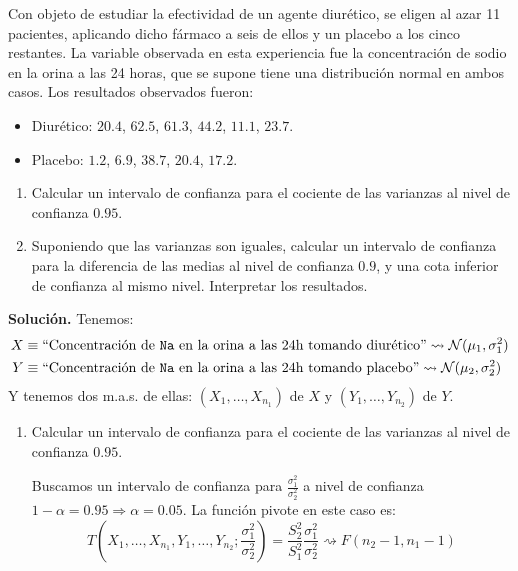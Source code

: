 \begin{ejercicio}
    Con objeto de estudiar la efectividad de un agente diurético, se eligen al azar 11 pacientes, aplicando dicho fármaco a seis de ellos y un placebo a los cinco restantes. La variable observada en esta experiencia fue la concentración de sodio en la orina a las 24 horas, que se supone tiene una distribución normal en ambos casos. Los resultados observados fueron:
    \begin{itemize}
        \item Diurético: $20.4$, $62.5$, $61.3$, $44.2$, $11.1$, $23.7$.
        \item Placebo: $1.2$, $6.9$, $38.7$, $20.4$, $17.2$.
    \end{itemize}
    \begin{enumerate}[label=\alph*)]
        \item Calcular un intervalo de confianza para el cociente de las varianzas al nivel de confianza $0.95$.
        \item Suponiendo que las varianzas son iguales, calcular un intervalo de confianza para la diferencia de las medias al nivel de confianza $0.9$, y una cota inferior de confianza al mismo nivel. Interpretar los resultados.
    \end{enumerate}
    
    \noindent
    \textbf{Solución.} Tenemos:
    \begin{align*}
        X&\equiv \text{``Concentración de \texttt{Na} en la orina a las 24h tomando diurético''} \rightsquigarrow \mathcal{N}(\mu_1,\sigma_1^2) \\
        Y&\equiv \text{``Concentración de \texttt{Na} en la orina a las 24h tomando placebo''} \rightsquigarrow \mathcal{N}(\mu_2, \sigma_2^2)
    \end{align*}
    Y tenemos dos m.a.s. de ellas: $(X_1, \ldots, X_{n_1})$ de $X$ y $(Y_1, \ldots, Y_{n_2})$ de $Y$.
    \begin{enumerate}[label=\alph*)]
        \item Calcular un intervalo de confianza para el cociente de las varianzas al nivel de confianza $0.95$.

            Buscamos un intervalo de confianza para $\frac{\sigma_1^2}{\sigma_2^2}$ a nivel de confianza $1-\alpha = 0.95\Longrightarrow \alpha = 0.05$. La función pivote en este caso es:
            \begin{equation*}
                T\left(X_1, \ldots, X_{n_1},Y_1, \ldots, Y_{n_2};\frac{\sigma_1^2}{\sigma_2^2}\right) = \frac{S_2^2}{S_1^2} \frac{\sigma_1^2}{\sigma_2^2} \rightsquigarrow F(n_2-1,n_1-1)
            \end{equation*}


\end{enumerate}
\end{ejercicio}
